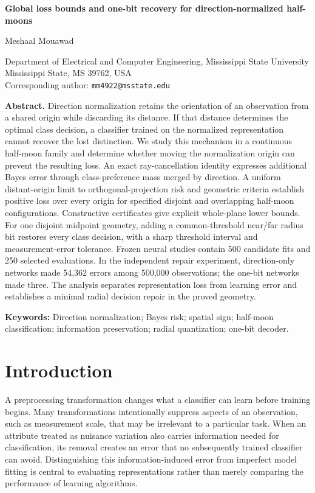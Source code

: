 \documentclass[12pt,a4paper]{article}
\begin{document}
\begin{center}
{\Large\bfseries Global loss bounds and one-bit recovery for direction-normalized half-moons\par}
\vspace{1em}
{\large Meshaal Mouawad\par}
Department of Electrical and Computer Engineering, Mississippi State University\\
Mississippi State, MS 39762, USA\\
Corresponding author: \texttt{mm4922@msstate.edu}
\end{center}
\vspace{1em}
\noindent\textbf{Abstract.}
Direction normalization retains the orientation of an observation from a shared origin while discarding its distance. If that distance determines the optimal class decision, a classifier trained on the normalized representation cannot recover the lost distinction. We study this mechanism in a continuous half-moon family and determine whether moving the normalization origin can prevent the resulting loss. An exact ray-cancellation identity expresses additional Bayes error through class-preference mass merged by direction. A uniform distant-origin limit to orthogonal-projection risk and geometric criteria establish positive loss over every origin for specified disjoint and overlapping half-moon configurations. Constructive certificates give explicit whole-plane lower bounds. For one disjoint midpoint geometry, adding a common-threshold near/far radius bit restores every class decision, with a sharp threshold interval and measurement-error tolerance. Frozen neural studies contain 500 candidate fits and 250 selected evaluations. In the independent repair experiment, direction-only networks made 54,362 errors among 500,000 observations; the one-bit networks made three. The analysis separates representation loss from learning error and establishes a minimal radial decision repair in the proved geometry.

\medskip\noindent\textbf{Keywords:}
Direction normalization; Bayes risk; spatial sign; half-moon classification; information preservation; radial quantization; one-bit decoder.

\section{Introduction}
A preprocessing transformation changes what a classifier can learn before training begins. Many transformations intentionally suppress aspects of an observation, such as measurement scale, that may be irrelevant to a particular task. When an attribute treated as nuisance variation also carries information needed for classification, its removal creates an error that no subsequently trained classifier can avoid. Distinguishing this information-induced error from imperfect model fitting is central to evaluating representations rather than merely comparing the performance of learning algorithms.
\end{document}
